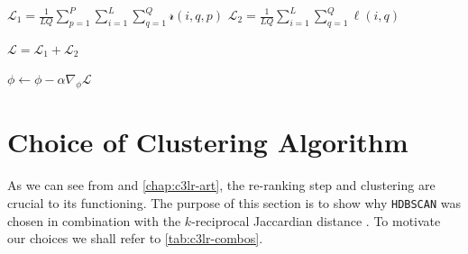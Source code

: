 \begin{algorithm}[ht]
{        \vspace{+0.15cm}
        $\mathcal{L}_{1}=\frac{1}{L Q} \sum_{p=1}^{P} \sum_{i=1}^{L} \sum_{q=1}^{Q} \mathscr{r}(i, q, p)$\;
        $\mathcal{L}_{2}=\frac{1}{L Q} \sum_{i=1}^{L} \sum_{q=1}^{Q} \ell(i, q)$\;
        
        $\mathcal{L} = \mathcal{L}_{1} + \mathcal{L}_{2}$
        
        $\phi \gets \phi-\alpha \nabla_{\phi} \mathcal{L}$\;
    }
\end{algorithm}


\section{Choice of Clustering Algorithm}\label{sec:c3lr-clustering-algo}

As we can see from  and \cref{chap:c3lr-art}, the re-ranking step and clustering are crucial to its functioning. The purpose of this section is to show why \texttt{HDBSCAN} \parencite{McInnes2017Hdbscan:Clustering} was chosen in combination with the $k$-reciprocal Jaccardian distance \parencite{ZhongRe-rankingEncoding}. To motivate our choices we shall refer to \cref{tab:c3lr-combos}.

